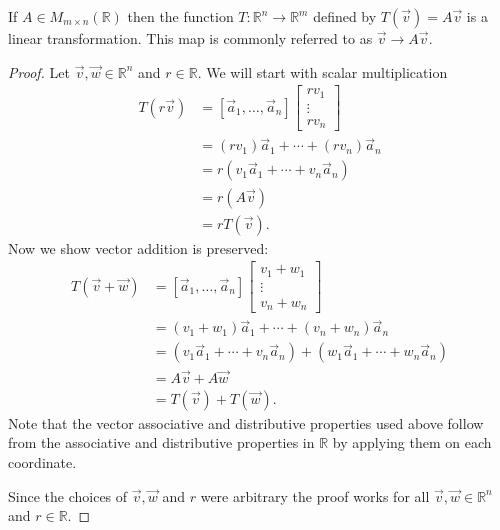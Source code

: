 \begin{proposition} If $A \in M_{m \times n}(\mathbb{R})$ then the function 
$T:\mathbb{R}^n \to \mathbb{R}^m$ defined by $T(\vec{v})=A\vec{v}$ is a linear 
transformation. This map is commonly referred to as $\vec{v} \to A\vec{v}$.
\label{prop:Av_is_linear}
\end{proposition}
\begin{proof}
Let $\vec{v},\vec{w} \in \mathbb{R}^n$ and $r \in \mathbb{R}$. 
We will start with scalar multiplication 
\begin{align*}
T(r\vec{v})
&=[\vec{a}_1, \ldots, \vec{a}_n]
\begin{bmatrix}rv_1\\ \vdots \\  rv_n\end{bmatrix}\\
&=(r v_1)\vec{a}_1+\cdots+(r v_n)\vec{a}_n\\
&=r (v_1\vec{a}_1+\cdots+v_n\vec{a}_n)\\
&=r (A\vec{v})\\
&=r T(\vec{v}).
\end{align*}
Now we show vector addition is preserved:
\begin{align*}
T(\vec{v}+\vec{w})
&=[\vec{a}_1, \ldots, \vec{a}_n]\begin{bmatrix}v_1+w_1\\ \vdots \\ v_n+w_n\end{bmatrix}\\
&=(v_1+w_1)\vec{a}_1+\cdots+(v_n+w_n)\vec{a}_n\\
&=(v_1\vec{a}_1+\cdots+v_n\vec{a}_n)+(w_1\vec{a}_1+\cdots+w_n\vec{a}_n)\\
&=A\vec{v}+A\vec{w}\\
&=T(\vec{v})+T(\vec{w}).
\end{align*}
Note that the vector associative and distributive properties used above 
follow from the associative and distributive properties in $\mathbb{R}$ 
by applying them on each coordinate.

Since the choices of $\vec{v},\vec{w}$ and $r$ were arbitrary the proof 
works for all $\vec{v},\vec{w} \in \mathbb{R}^n$ and $r \in \mathbb{R}$.
\end{proof}

